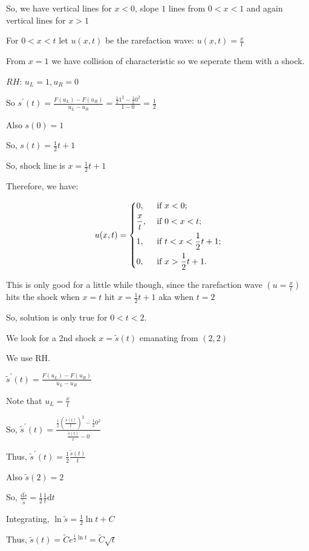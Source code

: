 \documentclass{article}
\theoremstyle{definition}
\begin{document}
So, we have vertical lines for \(x<0\), slope \(1\) lines from \(0<x<1\) and again vertical lines for \(x>1\) 

For \(0 < x < t\) let \(u(x,t)\) be the rarefaction wave: \(u(x,t)=\frac{x}{t}\)

From \(x=1\) we have collision of characteristic so we seperate them with a shock.

\(RH\): \(u_L = 1, u_R = 0\) 

So \(s^{\prime} (t) = \frac{F(u_L)-F(u_R)}{u_L - u_R }= \frac{\frac{1}{2}1^2 - \frac{1}{2}0^2}{1-0} = \frac{1}{2}\) 

Also \(s(0)=1\) 

So, \(s(t)=\frac{1}{2}t + 1\)

So, shock line is \(x = \frac{1}{2}t + 1\) 

Therefore, we have:

\[
    u(x,t)=\begin{dcases}
        0, &\text{ if } x < 0 ;\\
        \frac{x}{t}, &\text{ if } 0 < x < t ;\\
        1, &\text{ if } t < x < \frac{1}{2}t + 1;\\
        0, &\text{ if } x > \frac{1}{2}t + 1.
    \end{dcases}
\]

This is only good for a little while though, since the rarefaction wave \((u=\frac{x}{t})\)  hits the shock when \(x=t\) hit \(x=\frac{1}{2}t+1\) aka when \(t=2\) 

So, solution is only true for \(0 < t < 2\).

We look for a 2nd shock \(x = \tilde{s}(t)\)  emanating from \((2,2)\) 

We use RH.

\(\tilde{s}^{\prime} (t)=\frac{F(u_L)-F(u_R)}{u_L - u_R}\)

Note that \(u_L = \frac{x}{t}\)

So, \(\tilde{s}^{\prime} (t) = \frac{\frac{1}{2}\left( \frac{\tilde{s}(t)}{t} \right)^2 - \frac{1}{2}0^2}{\frac{\tilde{s}(t)}{t}- 0} \) 

Thus, \(\tilde{s}^{\prime} (t)=\frac{1}{2}\frac{\tilde{s}(t)}{t}\)

Also \(\tilde{s}(2)=2\) 

So, \(\frac{\mathrm{d} \tilde{s}}{\tilde{s}}=\frac{1}{2}\frac{1}{t}\mathrm{d} t\)

Integrating, \(\ln \tilde{s} = \frac{1}{2} \ln t + C\)

Thus, \(\tilde{s}(t)=\tilde{C}e^{\frac{1}{2}\ln t}=\tilde{C}\sqrt{t}\) 
\end{document}
